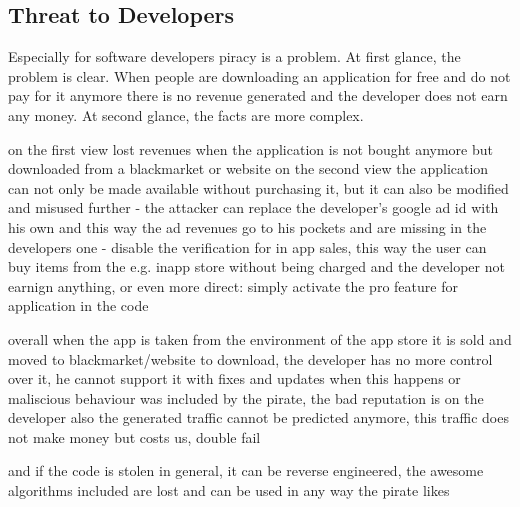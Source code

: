 \subsection{Threat to Developers} \label{subsection:foundation-piracy-developers}
Especially for software developers piracy is a problem.
At first glance, the problem is clear. When people are downloading an application for free and do not pay for it anymore there is no revenue generated and the developer does not earn any money. At second glance, the facts are more complex.

on the first view lost revenues when the application is not bought anymore but downloaded from a blackmarket or website
on the second view the application can not only be made available without purchasing it, but it can also be modified and misused further
- the attacker can replace the developer's google ad id with his own and this way the ad revenues go to his pockets and are missing in the developers one
- disable the verification for in app sales, this way the user can buy items from the e.g. inapp store without being charged and the developer not earnign anything, or even more direct: simply activate the pro feature for application in the code

overall when the app is taken from the environment of the app store it is sold  and moved to blackmarket/website to download, the developer has no more control over it, he cannot support it with fixes and updates
when this happens or maliscious behaviour was included by the pirate, the bad reputation is on the developer
also the generated traffic cannot be predicted anymore, this traffic does not make money but costs us, double fail

and if the code is stolen in general, it can be reverse engineered,  the awesome algorithms included are lost and can be used in any way the pirate likes
\cite{lierschDeveloperThreats}
